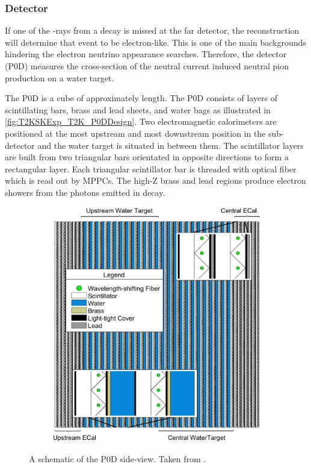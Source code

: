 \subsubsection{ Detector}
\label{subsubsec:T2KSKExp_T2K_P0D}

If one of the \quickmath{\gamma}-rays from a \quickmath{\pi^0 \rightarrow 2\gamma} decay is missed at the far detector, the reconstruction will determine that event to be electron-like. This is one of the main backgrounds hindering the electron neutrino appearance searches. Therefore, the  detector (P0D) measures the cross-section of the neutral current induced neutral pion production on a water target.

The P0D is a cube of approximately  length. The P0D consists of layers of scintillating bars, brass and lead sheets, and water bags as illustrated in \autoref{fig:T2KSKExp_T2K_P0DDesign}. Two electromagnetic calorimeters are positioned at the most upstream and most downstream position in the sub-detector and the water target is situated in between them. The scintillator layers are built from two triangular bars orientated in opposite directions to form a rectangular layer. Each triangular scintillator bar is threaded with optical fiber which is read out by MPPCs. The high-Z brass and lead regions produce electron showers from the photons emitted in  decay.

\begin{figure}[h]
  \begin{subfigure}[t]{0.55\textwidth}
    \includegraphics[width=\textwidth, trim={0mm 0mm 0mm 0mm}, clip,page=1]{Figures/Detectors/T2KP0DDesign.pdf}
  \end{subfigure}
  \caption{A schematic of the P0D side-view. Taken from \cite{Assylbekov2012}.}
  \label{fig:T2KSKExp_T2K_P0DDesign}
\end{figure}

